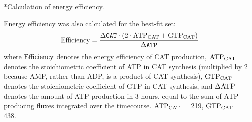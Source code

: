 \documentclass[12pt]{article}
\makeatletter
\renewcommand\subsection{\@startsection
	{subsection}{2}{0mm}
	{-0.05in}
	{-0.5\baselineskip}
	{\normalfont\normalsize\bfseries}}
\makeatother
\begin{document}
\subsection*{Calculation of energy efficiency.}

Energy efficiency was also calculated for the best-fit set:
\begin{equation}\label{eqn:energy-efficiency-definition}
	\rm Efficiency=\frac{\Delta\texttt{CAT}\cdot \left(2\cdot\rm {ATP}_{CAT}+\rm {GTP}_{CAT}\right)}{\Delta\texttt{ATP}}
\end{equation}
where $\rm Efficiency$ denotes the energy efficiency of CAT production, $\rm {ATP}_{CAT}$ denotes the stoichiometric coefficient of ATP in CAT synthesis (multiplied by 2 because AMP, rather than ADP, is a product of CAT synthesis), $\rm {GTP}_{CAT}$ denotes the stoichiometric coefficient of GTP in CAT synthesis, and $\rm \Delta ATP$ denotes the amount of ATP production in 3 hours, equal to the sum of ATP-producing fluxes integrated over the timecourse.
$\rm {ATP}_{CAT}$ = 219, $\rm {GTP}_{CAT}$ = 438.

\end{document}

